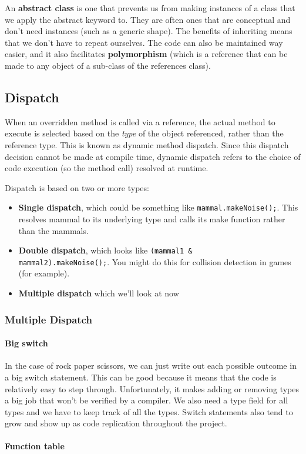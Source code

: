 \documentclass[11pt,a4paper,titlepage,dvipsnames,cmyk]{scrartcl}
\begin{document}
An \textbf{abstract class} is one that prevents us from making instances
of a class that we apply the abstract keyword to. They are often ones that
are conceptual and don't need instances (such as a generic shape). The
benefits of inheriting means that we don't have to repeat ourselves. The
code can also be maintained way easier, and it also facilitates
\textbf{polymorphism} (which is a reference that can be made to any object
of a sub-class of the references class).

\subsection{Dispatch}%
\label{sub:Dispatch}
When an overridden method is called via a reference, the actual method to
execute is selected based on the \textit{type} of the object referenced,
rather than the reference type. This is known as dynamic method dispatch.
Since this dispatch decision cannot be made at compile time, dynamic
dispatch refers to the choice of code execution (so the method call)
resolved at runtime.

Dispatch is based on two or more types:

\begin{itemize}
    \item \textbf{Single dispatch}, which could be something like
        \lstinline|mammal.makeNoise();|. This resolves mammal to its
        underlying type and calls its make function rather than the
        mammals.
    \item \textbf{Double dispatch}, which looks like \lstinline|(mammal1 &
        mammal2).makeNoise();|. You might do this for collision detection
        in games (for example).
    \item \textbf{Multiple dispatch} which we'll look at now
\end{itemize}

\subsubsection{Multiple Dispatch}%
\label{ssub:Multiple Dispatch}


\paragraph{Big switch}%
\label{par:Big switch}

In the case of rock paper scissors, we can just write out each possible
outcome in a big switch statement. This can be good because it means that
the code is relatively easy to step through. Unfortunately, it makes
adding or removing types a big job that won't be verified by a compiler.
We also need a type field for all types and we have to keep track of all
the types. Switch statements also tend to grow and show up as code
replication throughout the project.

\paragraph{Function table}%
\label{par:Function table}
\end{document}
